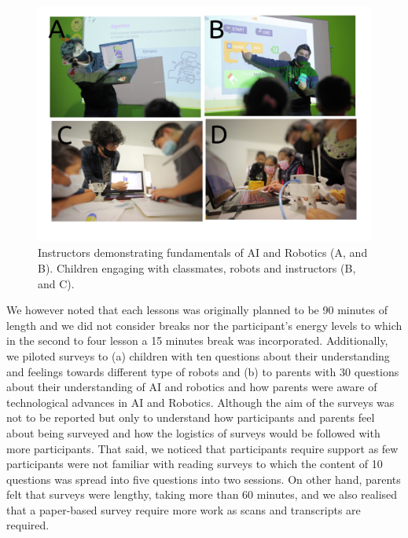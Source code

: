 \documentclass[conference]{IEEEtran}
\begin{document}
\begin{figure}[tbp]
    \includegraphics[width=\linewidth]{piloting-workshops/versions/drawing-v00.png} %
    \caption{
        Instructors demonstrating fundamentals of AI and Robotics (A, and B). 
        Children engaging with classmates, robots and instructors (B, and C).
        }
    \label{fig:pilot}
\end{figure}

We however noted that each lessons was originally planned to be 90 minutes of length and we did not consider breaks nor the participant's energy levels to which in the second to four lesson a 15 minutes break was incorporated.
Additionally, we piloted surveys to (a) children with ten questions about their understanding and feelings towards different type of robots and (b) to parents with 30 questions about their understanding of AI and robotics and how parents were aware of  technological advances in AI and Robotics.
Although the aim of the surveys was not to be reported but only to understand how participants and parents feel about being surveyed and how the logistics of surveys would be followed with more participants.
That said, we noticed that participants require support as few participants were not familiar with reading surveys to which the content of 10 questions was spread into five questions into two sessions.
On other hand, parents felt that surveys were lengthy, taking more than 60 minutes, and we also realised that a paper-based survey require more work as scans and transcripts are required. 
\end{document}
